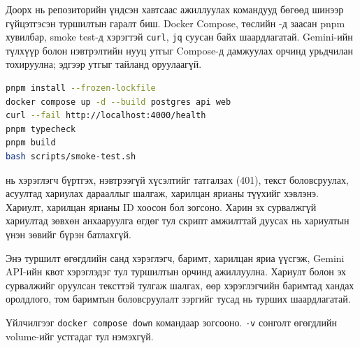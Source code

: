 \documentclass[../main.tex]{subfiles}
\begin{document}
Доорх нь репозиторийн үндсэн хавтсаас ажиллуулах командууд бөгөөд
шинээр гүйцэтгэсэн туршилтын гаралт биш. Docker Compose, төслийн
-д заасан pnpm хувилбар, smoke test-д хэрэгтэй
\texttt{curl}, \texttt{jq} суусан байх шаардлагатай. Gemini-ийн түлхүүр
болон нэвтрэлтийн нууц утгыг Compose-д дамжуулах орчинд урьдчилан
тохируулна; эдгээр утгыг тайланд оруулаагүй.

\begin{lstlisting}[language=bash, numbers=none, caption={Локал үйлчилгээг асаах, шалгах командууд}, label={lst:appendix-checks}]
pnpm install --frozen-lockfile
docker compose up -d --build postgres api web
curl --fail http://localhost:4000/health
pnpm typecheck
pnpm build
bash scripts/smoke-test.sh
\end{lstlisting}

 нь хэрэглэгч бүртгэх, нэвтрээгүй хүсэлтийг
татгалзах (401), текст боловсруулах, асуултад хариулах дарааллыг шалгаж,
харилцан ярианы түүхийг хэвлэнэ. Хариулт, харилцан ярианы ID хоосон бол
зогсоно. Харин эх сурвалжгүй хариултад зөвхөн анхааруулга өгдөг тул
скрипт амжилттай дуусах нь хариултын үнэн зөвийг бүрэн батлахгүй.

Энэ туршилт өгөгдлийн санд хэрэглэгч, баримт, харилцан яриа үүсгэж,
Gemini API-ийн квот хэрэглэдэг тул туршилтын орчинд ажиллуулна.
Хариулт болон эх сурвалжийг оруулсан тексттэй тулгаж шалгах,
өөр хэрэглэгчийн баримтад хандах оролдлого, том баримтын боловсруулалт
зэргийг тусад нь турших шаардлагатай.

Үйлчилгээг \texttt{docker compose down} командаар зогсооно.
\texttt{-v} сонголт өгөгдлийн volume-ийг устгадаг тул нэмэхгүй.

\endgroup
\end{document}
